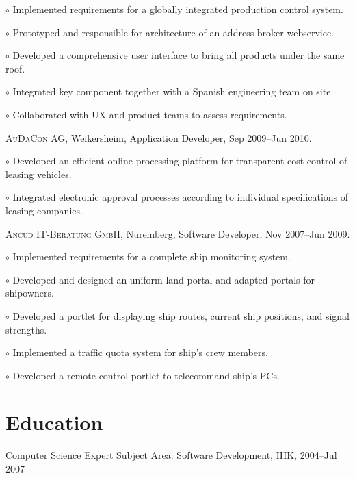 \documentclass[letterpaper]{article}
\renewenvironment{itemize}{
  \begin{list}{}{
    \setlength{\leftmargin}{1.5em}
  }
}{
  \end{list}
}
\newenvironment{no-indent-itemize}{
  \begin{list}{}{
    \setlength{\leftmargin}{0em}
  }
}{
  \end{list}
}
\def\bullet{$\circ$\xspace}
\begin{document}
\begin{no-indent-itemize}
\begin{itemize}
	\item\bullet Implemented requirements for a globally integrated production control system.
	\item\bullet Prototyped and responsible for architecture of an address broker webservice.
	\item\bullet Developed a comprehensive user interface to bring all products under the same roof.
	\item\bullet Integrated key component together with a Spanish engineering team on site.
    \item\bullet Collaborated with UX and product teams to assess requirements.
  \end{itemize}
    \item \textsc{AuDaCon AG}, Weikersheim, Application Developer, Sep 2009--Jun 2010.
  \begin{itemize}
    \item\bullet Developed an efficient online processing platform for transparent cost control of leasing vehicles.
    \item\bullet Integrated electronic approval processes according to individual specifications of leasing companies.
  \end{itemize}
    \item \textsc{Ancud IT-Beratung GmbH}, Nuremberg, Software Developer, Nov 2007--Jun 2009.
  \begin{itemize}
    \item\bullet Implemented requirements for a complete ship monitoring system.
    \item\bullet Developed and designed an uniform land portal and adapted portals for shipowners.
    \item\bullet Developed a portlet for displaying ship routes, current ship positions, and signal strengths.
    \item\bullet Implemented a traffic quota system for ship's crew members.
    \item\bullet Developed a remote control portlet to telecommand ship's PCs.
  \end{itemize}
\end{no-indent-itemize}

\section*{Education}
\begin{no-indent-itemize}
  \item Computer Science Expert Subject Area: Software Development, IHK, 2004--Jul 2007
\end{no-indent-itemize}
\end{document}
